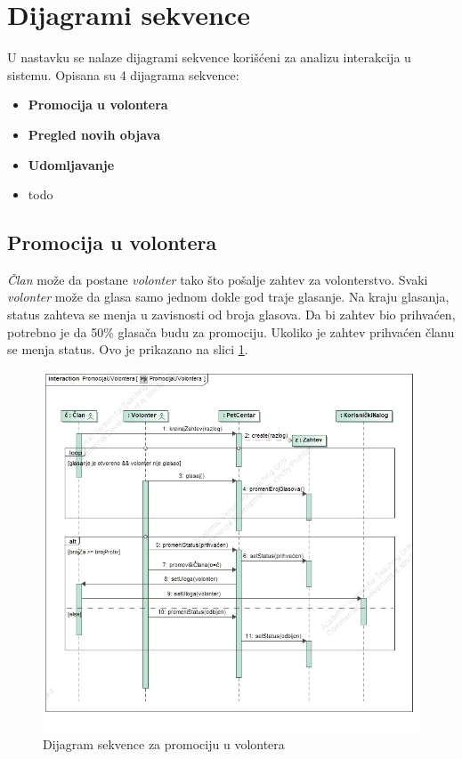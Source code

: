 \section{Dijagrami sekvence}
\par U nastavku se nalaze dijagrami sekvence korišćeni za analizu interakcija u sistemu. Opisana su 4 dijagrama sekvence:
\begin{itemize}
    \item \textbf{Promocija u volontera}
    \item \textbf{Pregled novih objava}
    \item \textbf{Udomljavanje}
    \item todo
\end{itemize}
\subsection{Promocija u volontera}
\par \textit{Član} može da postane \textit{volonter} tako što pošalje zahtev za volonterstvo. Svaki \textit{volonter} može da glasa samo jednom dokle god traje glasanje. 
Na kraju glasanja, status zahteva se menja u zavisnosti od broja glasova. Da bi zahtev bio prihvaćen,
potrebno je da 50\% glasača budu za promociju. Ukoliko je zahtev prihvaćen članu se menja status. Ovo je prikazano na slici \ref{fig:promotion-seq}.
\begin{figure}[h]
    \centering
    \includegraphics[width=\textwidth, height=0.9\textwidth]{img/promote-member-sequence.jpg}
    \caption{Dijagram sekvence za promociju u volontera}
    \label{fig:promotion-seq}
\end{figure}
